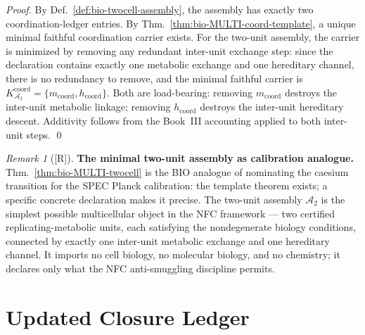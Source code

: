\documentclass[12pt,oneside]{amsbook}
\theoremstyle{plain}
\theoremstyle{definition}
\theoremstyle{remark}
\newtheorem{remark}[theorem]{Remark}
\newcommand{\status}[1]{\textup{[#1]}}
\begin{document}
\begin{proof}
By Def.~\ref{def:bio-twocell-assembly}, the assembly has exactly
two coordination-ledger entries.  By Thm.~\ref{thm:bio-MULTI-coord-template},
a unique minimal faithful coordination carrier exists.  For the
two-unit assembly, the carrier is minimized by removing any
redundant inter-unit exchange step: since the declaration contains
exactly one metabolic exchange and one hereditary channel, there
is no redundancy to remove, and the minimal faithful carrier is
$K^{\mathrm{coord}}_{\mathcal{A}_2} = \{m_{\mathrm{coord}},
h_{\mathrm{coord}}\}$.  Both are load-bearing: removing
$m_{\mathrm{coord}}$ destroys the inter-unit metabolic linkage;
removing $h_{\mathrm{coord}}$ destroys the inter-unit hereditary
descent.  Additivity follows from the Book~III accounting applied
to both inter-unit steps.
\qed
\end{proof}

\begin{remark}[\status{R}]\label{rem:bio-twocell-note}
\textbf{The minimal two-unit assembly as calibration analogue.}
Thm.~\ref{thm:bio-MULTI-twocell} is the BIO analogue of nominating
the caesium transition for the SPEC Planck calibration: the
template theorem exists; a specific concrete declaration makes
it precise.  The two-unit assembly $\mathcal{A}_2$ is the
simplest possible multicellular object in the NFC framework ---
two certified replicating-metabolic units, each satisfying the
nondegenerate biology conditions, connected by exactly one
inter-unit metabolic exchange and one hereditary channel.  It
imports no cell biology, no molecular biology, and no chemistry;
it declares only what the NFC anti-smuggling discipline permits.
\end{remark}

\section{Updated Closure Ledger}\label{sec:bio-closure-updated}
\end{document}
